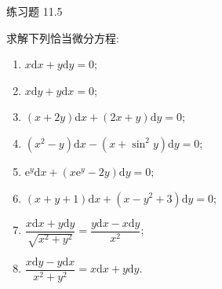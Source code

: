 \begin{exblock}{练习题 11.5}
\item 求解下列恰当微分方程:

  \begin{enumerate}[label=(\arabic*),leftmargin=2.6em,itemsep=0.15\baselineskip,topsep=0.2\baselineskip]

  \item $x\mathrm{d}x+y\mathrm{d}y=0$;

  \item $x\mathrm{d}y+y\mathrm{d}x=0$;

  \item $(x+2y)\mathrm{d}x+(2x+y)\mathrm{d}y=0$;

  \item $(x^{2}-y)\mathrm{d}x-(x+\sin^{2}y)\mathrm{d}y=0$;

  \item $\mathrm{e}^{y}\mathrm{d}x+(x\mathrm{e}^{y}-2y)\mathrm{d}y=0$;

  \item $(x+y+1)\mathrm{d}x+(x-y^{2}+3)\mathrm{d}y=0$;

  \item $\dfrac{x\mathrm{d}x+y\mathrm{d}y}{\sqrt{x^{2}+y^{2}}}=\dfrac{y\mathrm{d}x-x\mathrm{d}y}{x^{2}}$;

  \item $\dfrac{x\mathrm{d}y-y\mathrm{d}x}{x^{2}+y^{2}}=x\mathrm{d}x+y\mathrm{d}y$.

  \end{enumerate}
\end{exblock}
